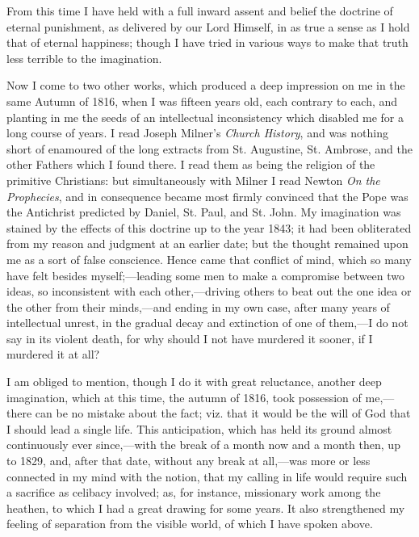 From this time I have held with a full inward assent and belief the doctrine of eternal
punishment, as delivered by our Lord Himself, in as true a sense as I
hold that of eternal happiness; though I have tried in various ways to
make that truth less terrible to the imagination.

Now I come to two other works, which produced a deep impression on
me in the same Autumn of 1816, when I was fifteen years old, each
contrary to each, and planting in me the seeds of an intellectual
inconsistency which disabled me for a long course of years. I read
Joseph Milner's \emph{Church History}, and was nothing short of enamoured of
the long extracts from St. Augustine, St. Ambrose, and the
other Fathers which I found there. I read them as being the religion
of the primitive Christians: but simultaneously with Milner I read
Newton \emph{On the Prophecies}, and in consequence became most firmly
convinced that the Pope was the Antichrist predicted by Daniel, St.
Paul, and St. John. My imagination was stained by the effects of this
doctrine up to the year 1843; it had been obliterated from my reason
and judgment at an earlier date; but the thought remained upon me as a
sort of false conscience. Hence came that conflict of mind, which so
many have felt besides myself;—leading some men to make a compromise
between two ideas, so inconsistent with each other,—driving others
to beat out the one idea or the other from their minds,—and ending
in my own case, after many years of intellectual unrest, in the
gradual decay and extinction of one of them,—I do not say in its
violent death, for why should I not have murdered it sooner, if I
murdered it at all?

I am obliged to mention, though I do it with great reluctance,
another deep imagination, which at this time, the autumn of 1816, took
possession of me,—there can be no mistake about the fact;
viz. that it would be the
will of God that I should lead a single life. This anticipation, which
has held its ground almost continuously ever since,—with the break
of a month now and a month then, up to 1829, and, after that date,
without any break at all,—was more or less connected in my mind with the notion, that my calling in life would require
such a sacrifice as celibacy involved; as, for instance, missionary
work among the heathen, to which I had a great drawing for some years.
It also strengthened my feeling of separation from the visible world,
of which I have spoken above.

